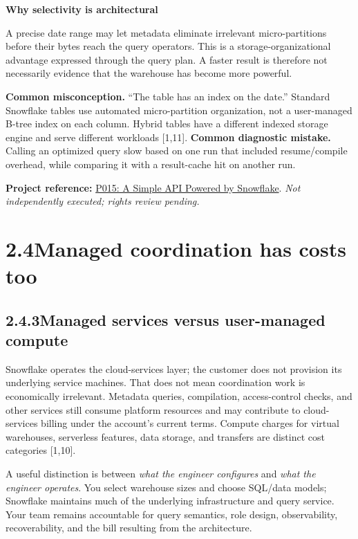 \documentclass[11pt,twoside]{article}
\newcommand{\topic}[2]{\subsection*{#1\quad #2}}
\newcommand{\repo}[2]{\par\begingroup\fontsize{8.0}{9.6}\selectfont\sffamily\color{inkgray}\textbf{Project reference:} \href{#2}{#1}. \textit{Not independently executed; rights review pending.}\par\endgroup}
\begin{document}
\begin{insight}
\textbf{Why selectivity is architectural}\par
A precise date range may let metadata eliminate irrelevant micro-partitions before their bytes reach the query operators. This is a storage-organizational advantage expressed through the query plan. A faster result is therefore not necessarily evidence that the warehouse has become more powerful.
\end{insight}
\textbf{Common misconception.} ``The table has an index on the date.'' Standard Snowflake tables use automated micro-partition organization, not a user-managed B-tree index on each column. Hybrid tables have a different indexed storage engine and serve different workloads [1,11]. \textbf{Common diagnostic mistake.} Calling an optimized query slow based on one run that included resume/compile overhead, while comparing it with a result-cache hit on another run.

\repo{P015: A Simple API Powered by Snowflake}{https://github.com/Snowflake-Labs/sfguide-snowflake-python-api}

\newpage
\section*{2.4\quad Managed coordination has costs too}
\topic{2.4.3}{Managed services versus user-managed compute}
Snowflake operates the cloud-services layer; the customer does not provision its underlying service machines. That does not mean coordination work is economically irrelevant. Metadata queries, compilation, access-control checks, and other services still consume platform resources and may contribute to cloud-services billing under the account's current terms. Compute charges for virtual warehouses, serverless features, data storage, and transfers are distinct cost categories [1,10].

A useful distinction is between \emph{what the engineer configures} and \emph{what the engineer operates}. You select warehouse sizes and choose SQL/data models; Snowflake maintains much of the underlying infrastructure and query service. Your team remains accountable for query semantics, role design, observability, recoverability, and the bill resulting from the architecture.
\end{document}
